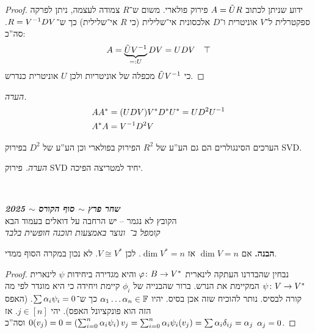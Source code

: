 \documentclass[]{../../../../tex/classes/styledArticle}
\begin{document}
	\section{}
	\begin{proof}
		ידוע שניתן לכתוב $A = \tilde UR$ פירוק פולארי. משום ש־$R$ צמודה לעצמה, ניתן לפרקה ספקטרלית ל־$V$ אוניטרית ו־$D$ אלכסונית אי־שלילית (כי $R$ אי־שלילית) כך ש־$R = V^{-1} DV$. סה''כ: 
		\[ A = \underbrace{\tilde UV^{-1}}_{=: U} DV = UDV \quad \top \]
		כי $\tilde UV^{-1}$ מכפלה של אוניטריות ולכן $U$ אוניטרית כנדרש. 
	\end{proof}
	
	\textit{הערה. }
	\begin{align*}
		AA^* &= (UDV) V^*D^*U^* = UD^2U^{-1} \\
		A^*A &= V^{-1} D^2 V
	\end{align*}
	
	הערכים הסינגולרים הם גם הע''ע של $R^2$ הפירוק בפולארי וכן הע''ע של $D^2$ בפירוק SVD. 
	
	\textit{הערה. }פירוק SVD יחיד למטריצה הפיכה. 
	
	{\dotfill \\ \vfil {\begin{center}
				{\Large \textbf{\textit{שחר פרץ $\sim$ סוף הקורס $\sim$ 2025}} \\
					\normalsize הקובץ לא נגמר – יש הרחבה על דואלים בעמוד הבא
					\\
					\scriptsize \textit{קומפל ב־}\en{\LaTeX}\,\textit{ ונוצר באמצעות תוכנה חופשית בלבד}}
		\end{center}} \vfil	}
	\pagebreak
	\textbf{הבנה. }אם $\dim V = n$ אז $\dim V^* = n$. לכן $V \cong V^*$. לא נכון במקרה הסוף ממדי. 
	
	
	\begin{proof}
		נבחין שהבדרנו העתקה לינארית $\varphi \colon B \to V^*$ והיא מגדירה ביחידות $\psi$ לינארית   $\psi \colon V \to V^*$ המקיימת את הנרש. ברור שהבנייה של $\phi_i$ קיימת ויחידה כי היא מוגדר לפי מה קורה לבסיס. נותר להוכיח שזה אכן בסיס. יהיו $\alpha_1 \dots \alpha_n \in \mathbb{F}$ כך ש־$\sum\alpha_i \psi_i = 0$. (האפס הזה הוא פונקציונל האפס). יהי $j \in [n]$. אז $0(v_j) = 0 = \left ( \sum_{i = 0}^{n} \alpha_i \psi_i \right )v_j = \sum_{i = 0}^{n} \alpha_i \psi_i(v_j) = \sum\alpha_i \delta_{ij} = \alpha_j$ וסה''כ $\alpha_j = 0$. 
	\end{proof}
	
\end{document}
